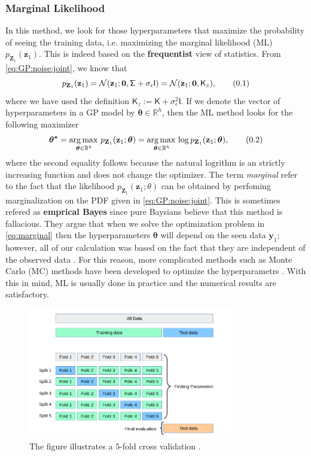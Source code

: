\documentclass[10pt]{article}
\theoremstyle{definition}
\newcommand\eqnum{\addtocounter{equation}{1}\tag{\arabic{section}.\arabic{equation}}}
\DeclareMathOperator*{\argmax}{\arg\max\,}
\begin{document}
\subsubsection{Marginal Likelihood}
In this method, we look for those hyperparameters that maximize the probability of seeing the training data, i.e. maximizing the marginal likelihood (ML) $p_{\mathbf{Z}_1}(\mathbf{z}_1)$. This is indeed based on the \textbf{frequentist} view of statistics. From \cref{eq:GP:noise:joint}, we know that
\begin{equation*}
p_{\mathbf{Z}_1}(\mathbf{z}_1) = 
\mathcal{N}(\mathbf{z}_1; \mathbf{0}, \mathsf{\Sigma}+\sigma_{\epsilon}\mathsf{I}) = 
\mathcal{N}(\mathbf{z}_1; \mathbf{0}, \mathsf{K}_z),
\eqnum
\end{equation*}
where we have used the definition $\mathsf{K}_z:= \mathsf{K}+\sigma_{\epsilon}^2\mathsf{I}$. If we denote the vector of hyperparameters in a GP model by $\boldsymbol{\theta}\in\mathbb{R}^h$, then the ML method looks for the following maximizer
\begin{equation}
\boldsymbol{\theta^{*}} = \argmax_{\boldsymbol{\theta}\in\mathbb{R}^h} p_{\mathbf{Z}_1}(\mathbf{z}_1; \boldsymbol{\theta}) =   
\argmax_{\boldsymbol{\theta}\in\mathbb{R}^h} \log p_{\mathbf{Z}_1}(\mathbf{z}_1; \boldsymbol{\theta}),
\eqnum
\label{eq:marginal}
\end{equation}
where the second equality follows because the natural logrithm is an strictly increasing function and does not change the optimizer. The term \textit{marginal} refer to the fact that the likelihood $p_{\mathbf{Z}_1}(\mathbf{z}_1;\theta)$ can be obtained by perfoming marginalization on the PDF given in \cref{eq:GP:noise:joint}. This is sometimes refered as \textbf{emprical Bayes} since pure Baysians believe that this method is fallacious. They argue that when we solve the optimization problem in \cref{eq:marginal} then the hyperparameters $\boldsymbol{\theta}$ will depend on the seen data $\mathbf{y}_1$; however, all of our calculation was based on the fact that they are independent of the observed data \cite[Lecture 9]{Freitas2013}. For this reason, more complicated methods such as Monte Carlo (MC) methods have been developed to optimize the hyperparametrs \cite[Section 45.5]{MacKay2003}. With this in mind, ML is usually done in practice and the numerical results are satisfactory. 
\begin{figure}[t!]
\centering
\includegraphics[width=9cm]{figs/cross-validation.png}
\caption{The figure illustrates a $5$-fold cross validation \cite{sklearn}.}
\label{fig:cross:validation}
\end{figure}
\end{document}
